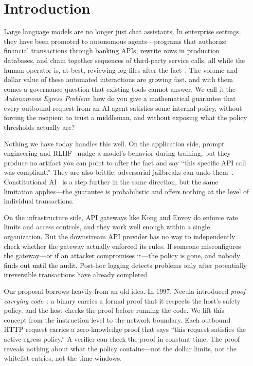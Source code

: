 \documentclass[10pt,conference]{IEEEtran}
\begin{document}
\section{Introduction}
\label{sec:intro}

Large language models are no longer just chat assistants. In enterprise settings, they have been promoted to autonomous agents---programs that authorize financial transactions through banking APIs, rewrite rows in production databases, and chain together sequences of third-party service calls, all while the human operator is, at best, reviewing log files after the fact~\cite{xi2023rise, wang2024survey}. The volume and dollar value of these automated interactions are growing fast, and with them comes a governance question that existing tools cannot answer. We call it the \emph{Autonomous Egress Problem}: how do you give a mathematical guarantee that every outbound request from an AI agent satisfies some internal policy, without forcing the recipient to trust a middleman, and without exposing what the policy thresholds actually are?

Nothing we have today handles this well. On the application side, prompt engineering and RLHF~\cite{ouyang2022training} nudge a model's behavior during training, but they produce no artifact you can point to after the fact and say ``this specific API call was compliant.'' They are also brittle: adversarial jailbreaks can undo them~\cite{perez2022red}. Constitutional AI~\cite{bai2022constitutional} is a step further in the same direction, but the same limitation applies---the guarantee is probabilistic and offers nothing at the level of individual transactions.

On the infrastructure side, API gateways like Kong and Envoy do enforce rate limits and access controls, and they work well enough within a single organization. But the downstream API provider has no way to independently check whether the gateway actually enforced its rules. If someone misconfigures the gateway---or if an attacker compromises it---the policy is gone, and nobody finds out until the audit. Post-hoc logging detects problems only after potentially irreversible transactions have already completed.

Our proposal borrows heavily from an old idea. In 1997, Necula introduced \emph{proof-carrying code}~\cite{necula1997proof}: a binary carries a formal proof that it respects the host's safety policy, and the host checks the proof before running the code. We lift this concept from the instruction level to the network boundary. Each outbound HTTP request carries a zero-knowledge proof that says ``this request satisfies the active egress policy.'' A verifier can check the proof in constant time. The proof reveals nothing about what the policy contains---not the dollar limits, not the whitelist entries, not the time windows.
\end{document}
